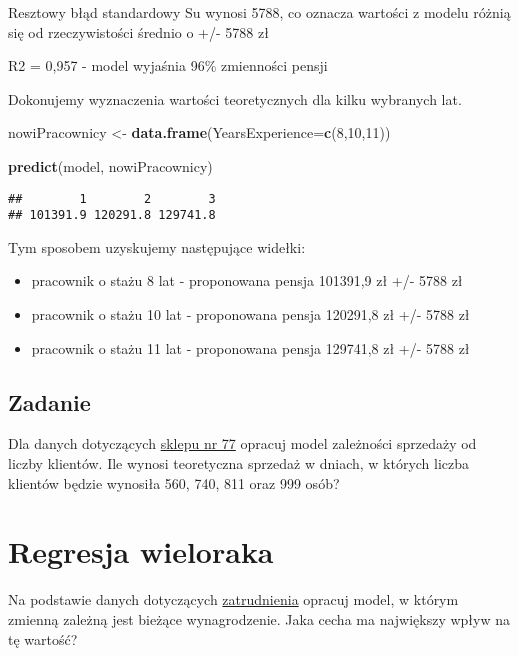 \documentclass[]{book}
\newenvironment{Shaded}{\begin{snugshade}}{\end{snugshade}}
\newcommand{\KeywordTok}[1]{\textcolor[rgb]{0.13,0.29,0.53}{\textbf{#1}}}
\newcommand{\DataTypeTok}[1]{\textcolor[rgb]{0.13,0.29,0.53}{#1}}
\newcommand{\DecValTok}[1]{\textcolor[rgb]{0.00,0.00,0.81}{#1}}
\newcommand{\StringTok}[1]{\textcolor[rgb]{0.31,0.60,0.02}{#1}}
\newcommand{\NormalTok}[1]{#1}
\providecommand{\tightlist}{%
  \setlength{\itemsep}{0pt}\setlength{\parskip}{0pt}}
\begin{document}
Resztowy błąd standardowy Su wynosi 5788, co oznacza wartości z modelu
różnią się od rzeczywistości średnio o +/- 5788 zł

R2 = 0,957 - model wyjaśnia 96\% zmienności pensji

Dokonujemy wyznaczenia wartości teoretycznych dla kilku wybranych lat.

\begin{Shaded}
\begin{Highlighting}[]
\NormalTok{nowiPracownicy <-}\StringTok{ }\KeywordTok{data.frame}\NormalTok{(}\DataTypeTok{YearsExperience=}\KeywordTok{c}\NormalTok{(}\DecValTok{8}\NormalTok{,}\DecValTok{10}\NormalTok{,}\DecValTok{11}\NormalTok{))}

\KeywordTok{predict}\NormalTok{(model, nowiPracownicy)}
\end{Highlighting}
\end{Shaded}

\begin{verbatim}
##        1        2        3 
## 101391.9 120291.8 129741.8
\end{verbatim}

Tym sposobem uzyskujemy następujące widełki:

\begin{itemize}
\tightlist
\item
  pracownik o stażu 8 lat - proponowana pensja 101391,9 zł +/- 5788 zł
\item
  pracownik o stażu 10 lat - proponowana pensja 120291,8 zł +/- 5788 zł
\item
  pracownik o stażu 11 lat - proponowana pensja 129741,8 zł +/- 5788 zł
\end{itemize}

\subsection{Zadanie}\label{zadanie}

Dla danych dotyczących \href{data/sklep77.csv}{sklepu nr 77} opracuj
model zależności sprzedaży od liczby klientów. Ile wynosi teoretyczna
sprzedaż w dniach, w których liczba klientów będzie wynosiła 560, 740,
811 oraz 999 osób?

\section{Regresja wieloraka}\label{regresja-wieloraka}

Na podstawie danych dotyczących
\href{data/pracownicy.xlsx}{zatrudnienia} opracuj model, w którym
zmienną zależną jest bieżące wynagrodzenie. Jaka cecha ma największy
wpływ na tę wartość?
\end{document}
